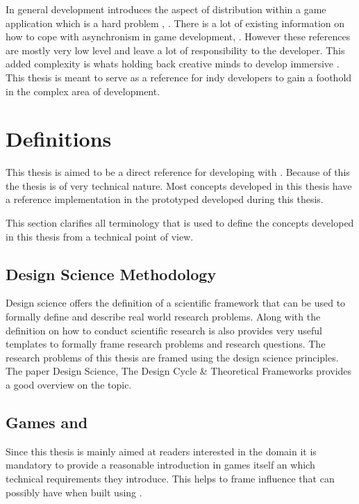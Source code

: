 In general \og{} development introduces the aspect of distribution within a game
application which is a hard problem \cite{pneuli1990distributed},
\cite{kupermann2001synthesizing}. There is a lot of existing information on how
to cope with asynchronism in game development\cite{gambetta_fast_paced},
\cite{gafferon2017games}. However these references are mostly very low level and
leave a lot of responsibility to the developer. This added complexity is whats
holding back creative minds to develop immersive \ogs{}. This thesis is meant to
serve as a reference for indy developers to gain a foothold in the complex area
of \og{} development.

\section{Definitions}

This thesis is aimed to be a direct reference for developing \ogs{} with \mss{}.
Because of this the thesis is of very technical nature. Most concepts developed
in this thesis have a reference implementation in the prototyped developed
during this thesis. 

This section clarifies all terminology that is used to define the concepts
developed in this thesis from a technical point of view.

\subsection{Design Science Methodology}

Design science offers the definition of a scientific framework that can be used
to formally define and describe real world research problems. Along with the
definition on how to conduct scientific research is also provides very useful
templates to formally frame research problems and research questions. The
research problems of this thesis are framed using the design science principles.
The paper Design Science, The Design Cycle \& Theoretical Frameworks
\cite{biedermann2016design_science} provides a good overview on the topic.

\subsection{Games and \ogs{}}
\label{sub:games}

Since this thesis is mainly aimed at readers interested in the \ms{} domain it
is mandatory to provide a reasonable introduction in games itself an which
technical requirements they introduce. This helps to frame influence that \ogs{}
can possibly have when built using \mss{}.

